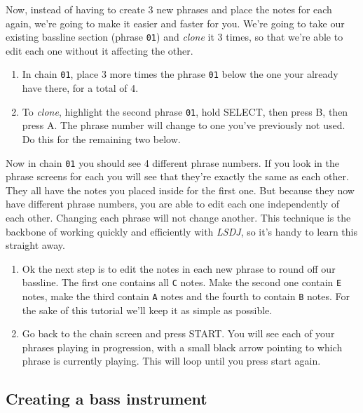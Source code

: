 \documentclass[]{article}
\newcommand{\buttonStyle}[1]{\textsf{#1}\xspace}
\newcommand{\bA}{\buttonStyle{A}}
\newcommand{\bB}{\buttonStyle{B}}
\newcommand{\bStart}{\buttonStyle{{START}}}
\newcommand{\bSelect}{\buttonStyle{{SELECT}}}
\newcommand{\gbtxt}[1]{\texttt{#1}\xspace}
\newcommand{\lsdj}{\textit{LSDJ}\xspace}
\begin{document}
Now, instead of having to create 3 new phrases and place the notes for each again, we're going to make it easier and faster for you. We're going to take our existing bassline section (phrase \gbtxt{01}) and \textit{clone} it 3 times, so that we're able to edit each one without it affecting the other. 

\begin{enumerate}[resume]

\item In chain \gbtxt{01}, place 3 more times the phrase \gbtxt{01} below the one your already have there, for a total of 4.

\item To \textit{clone}, highlight the second phrase \gbtxt{01}, hold \bSelect, then press \bB, then press \bA. The phrase number will change to one you've previously not used. Do this for the remaining two below.

\end{enumerate}

Now in chain \gbtxt{01} you should see 4 different phrase numbers. If you look in the phrase screens for each you will see that they're exactly the same as each other. They all have the notes you placed inside for the first one. But because they now have different phrase numbers, you are able to edit each one independently of each other. Changing each phrase will not change another. This technique is the backbone of working quickly and efficiently with \lsdj, so it's handy to learn this straight away.


\begin{enumerate}[resume]

\item 
Ok the next step is to edit the notes in each new phrase to round off our bassline.
The first one contains all \gbtxt{C} notes. Make the second one contain \gbtxt{E} notes, make the third contain \gbtxt{A} notes and the fourth to contain \gbtxt{B} notes. For the sake of this tutorial we'll keep it as simple as possible.

\item Go back to the chain screen and press \bStart. You will see each of your phrases playing in progression, with a small black arrow pointing to which phrase is currently playing. This will loop until you press start again.

\end{enumerate}


\subsection{Creating a bass instrument}
\end{document}
